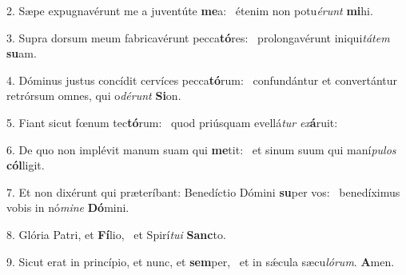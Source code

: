 2. Sæpe expugnavérunt me a juventúte \textbf{me}a: \ast\  étenim non potu\textit{é}\textit{runt} \textbf{mi}hi.\

3. Supra dorsum meum fabricavérunt pecca\textbf{tó}res: \ast\  prolongavérunt iniqui\textit{tá}\textit{tem} \textbf{su}am.\

4. Dóminus justus concídit cervíces pecca\textbf{tó}rum: \ast\  confundántur et convertántur retrórsum omnes, qui o\textit{dé}\textit{runt} \textbf{Si}on.\

5. Fiant sicut fœnum tec\textbf{tó}rum: \ast\  quod priúsquam evellá\textit{tur} \textit{ex}\textbf{á}ruit:\

6. De quo non implévit manum suam qui \textbf{me}tit: \ast\  et sinum suum qui maní\textit{pu}\textit{los} \textbf{cól}ligit.\

7. Et non dixérunt qui præteríbant: Benedíctio Dómini \textbf{su}per vos: \ast\  benedíximus vobis in nó\textit{mi}\textit{ne} \textbf{Dó}mini.\

8. Glória Patri, et \textbf{Fí}lio, \ast\  et Spirí\textit{tu}\textit{i} \textbf{Sanc}to.\

9. Sicut erat in princípio, et nunc, et \textbf{sem}per, \ast\  et in sǽcula sæcu\textit{ló}\textit{rum}. \textbf{A}men.\

